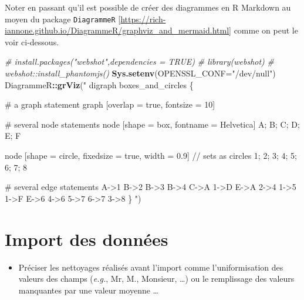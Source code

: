 \documentclass[mstat,12pt]{unswthesis}
\newenvironment{Shaded}{\begin{snugshade}}{\end{snugshade}}
\newcommand{\AttributeTok}[1]{\textcolor[rgb]{0.13,0.29,0.53}{#1}}
\newcommand{\CommentTok}[1]{\textcolor[rgb]{0.56,0.35,0.01}{\textit{#1}}}
\newcommand{\FunctionTok}[1]{\textcolor[rgb]{0.13,0.29,0.53}{\textbf{#1}}}
\newcommand{\NormalTok}[1]{#1}
\newcommand{\SpecialCharTok}[1]{\textcolor[rgb]{0.81,0.36,0.00}{\textbf{#1}}}
\newcommand{\StringTok}[1]{\textcolor[rgb]{0.31,0.60,0.02}{#1}}
\begin{document}
\bigskip

Noter en passant qu'il est possible de créer des diagrammes en R
Markdown au moyen du package \texttt{DiagrammeR}
{[}\url{https://rich-iannone.github.io/DiagrammeR/graphviz_and_mermaid.html}{]}
comme on peut le voir ci-dessous.

\begin{Shaded}
\begin{Highlighting}[]
\CommentTok{\# install.packages("webshot",dependencies = TRUE)}
\CommentTok{\# library(webshot)}
\CommentTok{\# webshot::install\_phantomjs()}
\FunctionTok{Sys.setenv}\NormalTok{(}\AttributeTok{OPENSSL\_CONF=}\StringTok{"/dev/null"}\NormalTok{)}
\NormalTok{DiagrammeR}\SpecialCharTok{::}\FunctionTok{grViz}\NormalTok{(}\StringTok{"}
\StringTok{digraph boxes\_and\_circles \{}

\StringTok{  \# a \textquotesingle{}graph\textquotesingle{} statement}
\StringTok{  graph [overlap = true, fontsize = 10]}

\StringTok{  \# several \textquotesingle{}node\textquotesingle{} statements}
\StringTok{  node [shape = box,}
\StringTok{        fontname = Helvetica]}
\StringTok{  A; B; C; D; E; F}

\StringTok{  node [shape = circle,}
\StringTok{        fixedsize = true,}
\StringTok{        width = 0.9] // sets as circles}
\StringTok{  1; 2; 3; 4; 5; 6; 7; 8}

\StringTok{  \# several \textquotesingle{}edge\textquotesingle{} statements}
\StringTok{  A{-}\textgreater{}1 B{-}\textgreater{}2 B{-}\textgreater{}3 B{-}\textgreater{}4 C{-}\textgreater{}A}
\StringTok{  1{-}\textgreater{}D E{-}\textgreater{}A 2{-}\textgreater{}4 1{-}\textgreater{}5 1{-}\textgreater{}F}
\StringTok{  E{-}\textgreater{}6 4{-}\textgreater{}6 5{-}\textgreater{}7 6{-}\textgreater{}7 3{-}\textgreater{}8}
\StringTok{\}}
\StringTok{"}\NormalTok{)}
\end{Highlighting}
\end{Shaded}

\section{Import des données}\label{import-des-donnuxe9es}

\begin{itemize}
\tightlist
\item
  Préciser les nettoyages réalisés avant l'import comme l'uniformisation
  des valeurs des champs (\emph{e.g.}, Mr, M., Monsieur, \ldots) ou le
  remplissage des valeurs manquantes par une valeur moyenne \ldots{}
\end{itemize}
\end{document}
